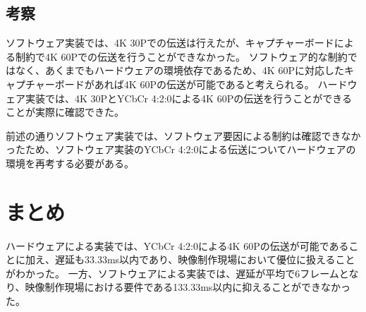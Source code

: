 \subsection{考察}
ソフトウェア実装では、4K 30Pでの伝送は行えたが、キャプチャーボードによる制約で4K 60Pでの伝送を行うことができなかった。
ソフトウェア的な制約ではなく、あくまでもハードウェアの環境依存であるため、4K 60Pに対応したキャプチャーボードがあれば4K 60Pの伝送が可能であると考えられる。
ハードウェア実装では、4K 30PとYCbCr 4:2:0による4K 60Pの伝送を行うことができることが実際に確認できた。

前述の通りソフトウェア実装では、ソフトウェア要因による制約は確認できなかったため、ソフトウェア実装のYCbCr 4:2:0による伝送についてハードウェアの環境を再考する必要がある。


\section{まとめ}

ハードウェアによる実装では、YCbCr 4:2:0による4K 60Pの伝送が可能であることに加え、遅延も33.33ms以内であり、映像制作現場において優位に扱えることがわかった。
一方、ソフトウェアによる実装では、遅延が平均で6フレームとなり、映像制作現場における要件である133.33ms以内に抑えることができなかった。

